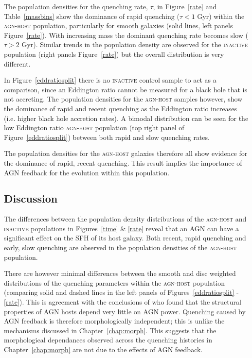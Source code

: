 The population densities for the quenching rate, $\tau$, in Figure~\ref{rate} and Table~\ref{massbins} show the dominance of rapid quenching ($\tau < 1$ Gyr) within the \textsc{agn-host} population, particularly for smooth galaxies (solid lines, left panels Figure~\ref{rate}). With increasing mass the dominant quenching rate becomes slow ($\tau > 2$ Gyr). Similar trends in the population density are observed for the \textsc{inactive} population (right panels Figure~\ref{rate}) but the overall distribution is very different. 

In Figure~\ref{eddratiosplit} there is no \textsc{inactive} control sample to act as a comparison, since an Eddington ratio cannot be measured for a black hole that is not accreting. The population densities for the \textsc{agn-host} samples however, show the dominance of rapid and recent quenching as the Eddington ratio increases (i.e. higher black hole accretion rates). A bimodal distribution can be seen for the low Eddington ratio \textsc{agn-host} population (top right panel of Figure~\ref{eddratiosplit}) between both rapid and slow quenching rates. 

The population densities for the \textsc{agn-host} galaxies therefore all show evidence for the dominance of rapid, recent quenching. This result implies the importance of AGN feedback for the evolution within this population.

\subsection{Discussion}\label{sec:agndis}

The differences between the population density distributions of the \textsc{agn-host} and \textsc{inactive} populations in Figures~\ref{time} \& \ref{rate} reveal that an AGN can have a significant effect on the SFH of its host galaxy. Both recent, rapid quenching and early, slow quenching are observed in the population densities of the \textsc{agn-host} population. 

There are however minimal differences between the smooth and disc weighted distributions of the quenching parameters within the \textsc{agn-host} population (comparing solid and dashed lines in the left panels of Figures~\ref{eddratiosplit} - \ref{rate}). This is agreement with the conclusions of \citet{kauffmann03b} who found that the structural properties of AGN hosts depend very little on AGN power. Quenching caused by AGN feedback is therefore morphologically independent; this is unlike the mechanisms discussed in Chapter~\ref{chap:morph}. This suggests that the morphological dependances observed across the quenching histories in Chapter~\ref{chap:morph} are not due to the effects of AGN feedback. 


